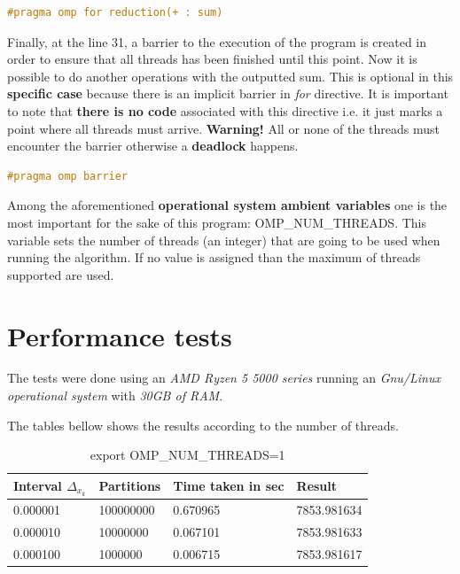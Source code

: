 		\begin{lstlisting}[language=C++]
#pragma omp for reduction(+ : sum)
		\end{lstlisting}
	
		\par Finally, at the line 31, a barrier to the execution of the program is created in order to ensure that all threads has been finished until this point. Now it is possible to do another operations with the outputted sum.  This is optional in this \textbf{specific case} because there is an implicit barrier in \textit{for} directive. It is important to note that \textbf{there is no code} associated with this directive i.e. it just marks a point where all threads must arrive. \textbf{Warning!} All or none of the threads must encounter the barrier otherwise a \textbf{deadlock} happens.
		
		\begin{lstlisting}[language=C++]
#pragma omp barrier
		\end{lstlisting}
	
		\par Among the aforementioned \textbf{operational system ambient variables} one is the most important for the sake of this program: OMP\_NUM\_THREADS. This variable sets the number of threads (an integer) that are going to be used when running the algorithm. If no value is assigned than the maximum of threads supported are used.

	\section{Performance tests}
		\par The tests were done using an \textit{AMD Ryzen 5 5000 series} running an \textit{Gnu/Linux operational system} with \textit{30GB of RAM}.\newline
		
		\par The tables bellow shows the results according to the number of threads. 
		
		\begin{table}[h]
			\caption{export OMP\_NUM\_THREADS=1}
			\begin{center}
				\begin{tabular}{|l|l|l|l|}
					\hline
					Interval $\Delta_{x_k}$  &  Partitions  &  Time taken in sec &  Result \\
					\hline
					0.000001  &  100000000  &  0.670965  &  7853.981634 \\
					\hline
					0.000010  &  10000000  &  0.067101  &  7853.981633 \\
					\hline
					0.000100  &  1000000  &  0.006715  &  7853.981617 \\
					\hline
				\end{tabular}
			\end{center}
		\end{table}
		
